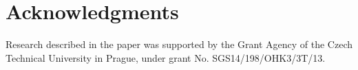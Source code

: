 \documentclass{sig-alternate}
\begin{document}
\section{Acknowledgments}
Research described in the paper was supported by the
Grant Agency of the Czech Technical University in Prague, under grant No. SGS14/198/OHK3/3T/13.

%

%
%
\end{document}
